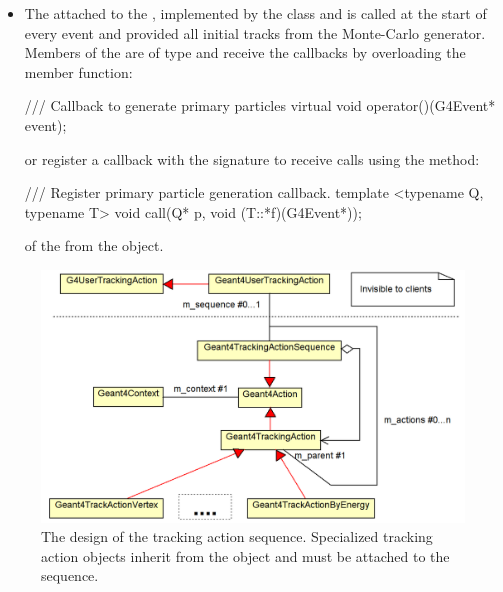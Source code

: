 \begin{itemize}
\item The  attached to the , implemented 
    by the  class and is called at the start of 
    every event and provided all initial tracks from the Monte-Carlo generator.
    Members of the  are of type
     and receive the callbacks by overloading the member function:
\begin{unnumberedcode}
/// Callback to generate primary particles
virtual void operator()(G4Event* event);
\end{unnumberedcode}
    or register a callback with the signature {}
    to receive calls using the method:
\begin{unnumberedcode}
/// Register primary particle generation callback.
template <typename Q, typename T> void call(Q* p, void (T::*f)(G4Event*));
\end{unnumberedcode}
    of the  from the  object.

\end{itemize}
\begin{figure}[t]
  \begin{center}
    \includegraphics[width=160mm] {DDG4-TrackingAction.png}
    \caption{The design of the tracking action sequence. Specialized 
               tracking action objects inherit from the 
               object and must be attached to the sequence.}
    \label{fig:ddg4-implementation-tracking-action}
  \end{center}
\end{figure}

